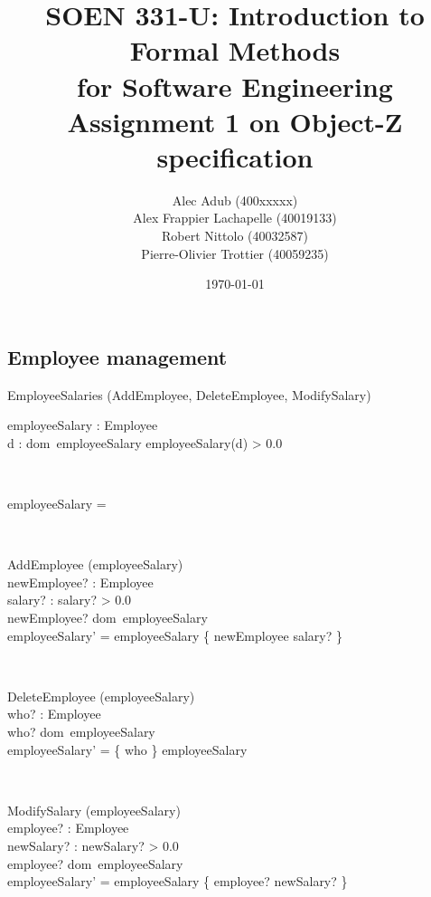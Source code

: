 \documentclass[12pt]{article}
\title{SOEN 331-U: Introduction to Formal Methods\\for Software Engineering\\
Assignment 1 on Object-Z specification}
\author{\begin{tabular}{c}
Alec Adub (400xxxxx) \tabularnewline
Alex Frappier Lachapelle (40019133) \tabularnewline
Robert Nittolo (40032587) \tabularnewline
Pierre-Olivier Trottier (40059235) \tabularnewline\\
\end{tabular}
}
\date{\today}
\begin{document}
\begin{spacing}{1.5}

\maketitle

\newpage

\section{Employee management}

\begin{class}{EmployeeSalaries}
\also
\upharpoonright (AddEmployee, DeleteEmployee, ModifySalary) \\
\begin{state}
employeeSalary : Employee \pfun {}\\
\where
\forall d : dom~employeeSalary \bullet employeeSalary(d) > 0.0
\end{state} \\
\begin{init}
employeeSalary = \emptyset %
\end{init} \\
\begin{op}{AddEmployee}
\Delta (employeeSalary) \\
newEmployee? : Employee\\
salary? : 
\ST
salary? > 0.0 \\
newEmployee? \notin dom~employeeSalary\\
employeeSalary' = employeeSalary \cup \{ newEmployee \mapsto salary? \}
\end{op}\\
\begin{op}{DeleteEmployee}
\Delta (employeeSalary) \\
who? : Employee\\
\ST
who? \in dom~employeeSalary\\
employeeSalary' = \{ who \} \ndres employeeSalary
\end{op}\\
\begin{op}{ModifySalary}
\Delta (employeeSalary) \\
employee? : Employee\\
newSalary? : 
\ST
newSalary? > 0.0 \\
employee? \in dom~employeeSalary\\
employeeSalary' = employeeSalary \oplus \{ employee? \mapsto newSalary? \}
\end{op}\\
\end{class}





\end{spacing}
\end{document}
